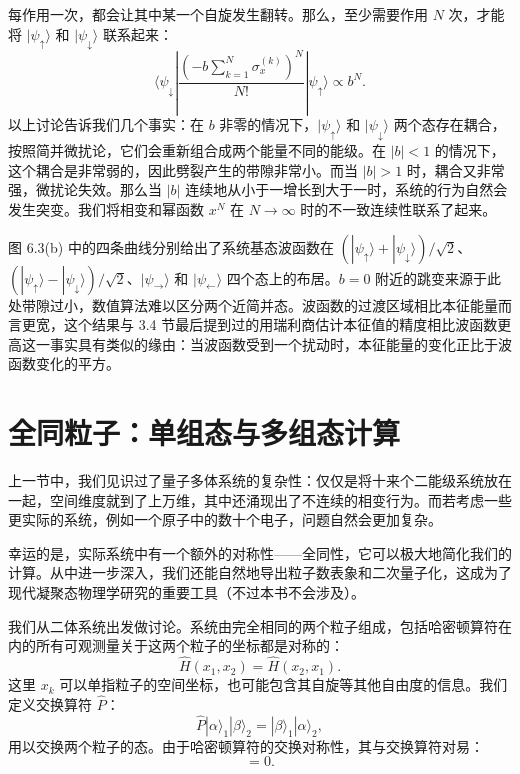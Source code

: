每作用一次，都会让其中某一个自旋发生翻转。那么，至少需要作用 $N$ 次，才能将 $|\psi_\uparrow\rangle$ 和 $|\psi_\downarrow\rangle$ 联系起来：
\begin{equation}
 \langle\psi_\downarrow|\frac{\left(-b\sum_{k=1}^{N}\sigma_x^{(k)}\right)^N}{N!}|\psi_\uparrow\rangle\propto b^N.
\tag{6.3.15}
\end{equation}
以上讨论告诉我们几个事实：在 $b$ 非零的情况下，$|\psi_\uparrow\rangle$ 和 $|\psi_\downarrow\rangle$ 两个态存在耦合，按照简并微扰论，它们会重新组合成两个能量不同的能级。在 $|b|<1$ 的情况下，这个耦合是非常弱的，因此劈裂产生的带隙非常小。而当 $|b|>1$ 时，耦合又非常强，微扰论失效。那么当 $|b|$ 连续地从小于一增长到大于一时，系统的行为自然会发生突变。我们将相变和幂函数 $x^N$ 在 $N\to\infty$ 时的不一致连续性联系了起来。

图 6.3(b) 中的四条曲线分别给出了系统基态波函数在 $(|\psi_\uparrow\rangle+|\psi_\downarrow\rangle)/\sqrt2$、$(|\psi_\uparrow\rangle-|\psi_\downarrow\rangle)/\sqrt2$、$|\psi_\rightarrow\rangle$ 和 $|\psi_\leftarrow\rangle$ 四个态上的布居。$b=0$ 附近的跳变来源于此处带隙过小，数值算法难以区分两个近简并态。波函数的过渡区域相比本征能量而言更宽，这个结果与 3.4 节最后提到过的用瑞利商估计本征值的精度相比波函数更高这一事实具有类似的缘由：当波函数受到一个扰动时，本征能量的变化正比于波函数变化的平方。


\section{全同粒子：单组态与多组态计算}

上一节中，我们见识过了量子多体系统的复杂性：仅仅是将十来个二能级系统放在一起，空间维度就到了上万维，其中还涌现出了不连续的相变行为。而若考虑一些更实际的系统，例如一个原子中的数十个电子，问题自然会更加复杂。

幸运的是，实际系统中有一个额外的对称性——全同性，它可以极大地简化我们的计算。从中进一步深入，我们还能自然地导出粒子数表象和二次量子化，这成为了现代凝聚态物理学研究的重要工具（不过本书不会涉及）。

我们从二体系统出发做讨论。系统由完全相同的两个粒子组成，包括哈密顿算符在内的所有可观测量关于这两个粒子的坐标都是对称的：
\begin{equation}
 \hat H(x_1,x_2)=\hat H(x_2,x_1).
\tag{6.4.1}
\end{equation}
这里 $x_k$ 可以单指粒子的空间坐标，也可能包含其自旋等其他自由度的信息。我们定义交换算符 $\hat P$：
\begin{equation}
 \hat P|\alpha\rangle_1|\beta\rangle_2=|\beta\rangle_1|\alpha\rangle_2,
\tag{6.4.2}
\end{equation}
用以交换两个粒子的态。由于哈密顿算符的交换对称性，其与交换算符对易：
\begin{equation}
 [\hat H,\hat P]=0.
\tag{6.4.3}
\end{equation}

